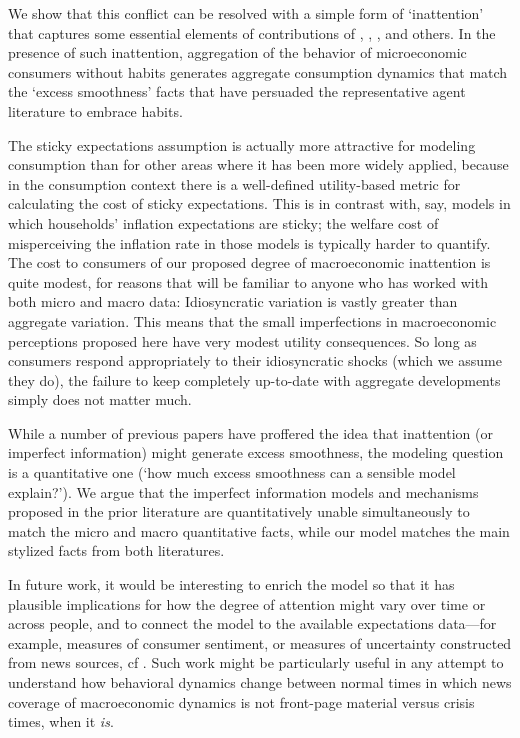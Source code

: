 We show that this conflict can be resolved with a simple form of `inattention' that captures some essential elements of contributions of \cite{simsInattention}, \cite{woodfordImperfect}, \cite{mrSlumps}, and others.  In the presence of such inattention, aggregation of the behavior of microeconomic consumers without habits generates aggregate consumption dynamics that match the `excess smoothness' facts that have persuaded the representative agent literature to embrace habits.

The sticky expectations assumption is actually more attractive for modeling consumption than for other areas where it has been more widely applied, because in the consumption context there is a well-defined utility-based metric for calculating the cost of sticky expectations.  This is in contrast with, say, models in which households' inflation expectations are sticky; the welfare cost of misperceiving the inflation rate in those models is typically harder to quantify.  The cost to consumers of our proposed degree of macroeconomic inattention is quite modest, for reasons that will be familiar to anyone who has worked with both micro and macro data: Idiosyncratic variation is vastly greater than aggregate variation.  This means that the small imperfections in macroeconomic perceptions proposed here have very modest utility consequences.  So long as consumers respond appropriately to their idiosyncratic shocks (which we assume they do), the failure to keep completely up-to-date with aggregate developments simply does not matter much.

While a number of previous papers have proffered the idea that inattention (or imperfect information) might generate excess smoothness, the modeling question is a quantitative one (`how much excess smoothness can a sensible model explain?').  We argue that the imperfect information models and mechanisms proposed in the prior literature are quantitatively unable simultaneously to match the micro and macro quantitative facts, while our model matches the main stylized facts from both literatures.

In future work, it would be interesting to enrich the model so that it has plausible implications for how the degree of attention might vary over time or across people, and to connect the model to the available expectations data---for example, measures of consumer sentiment, or measures of uncertainty constructed from news sources, cf \cite{bbdUncertainty}.  Such work might be particularly useful in any attempt to understand how behavioral dynamics change between normal times in which news coverage of macroeconomic dynamics is not front-page material versus crisis times, when it {\it is}.



\small

\normalsize

% 


\appendix
